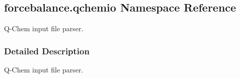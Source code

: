 \hypertarget{namespaceforcebalance_1_1qchemio}{}\subsection{forcebalance.\+qchemio Namespace Reference}
\label{namespaceforcebalance_1_1qchemio}


Q-\/\+Chem input file parser.  




\subsubsection{Detailed Description}
Q-\/\+Chem input file parser. 

